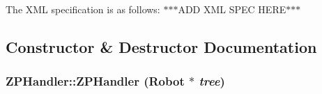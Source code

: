 The XML specification is as follows: $\ast$$\ast$$\ast$ADD XML SPEC HERE$\ast$$\ast$$\ast$ 

\subsection{Constructor \& Destructor Documentation}
\hypertarget{class_robot_model_1_1_z_p_handler_aa418554ca19e4c6f79cf7c2b3e747723}{
\subsubsection[{ZPHandler}]{\setlength{\rightskip}{0pt plus 5cm}ZPHandler::ZPHandler ({\bf Robot} $\ast$ {\em tree})}}
\label{class_robot_model_1_1_z_p_handler_aa418554ca19e4c6f79cf7c2b3e747723}


